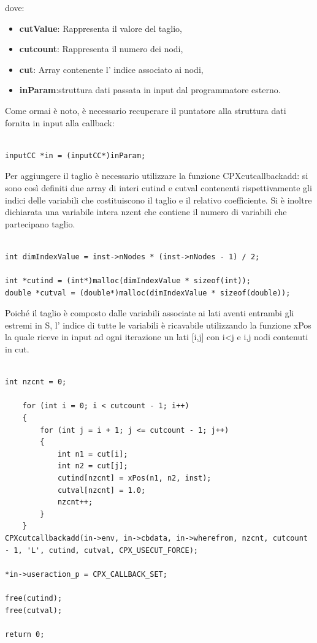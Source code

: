 \documentclass[11pt]{article}
\begin{document}
dove:

\begin{itemize}
	\item \textbf{cutValue}: Rappresenta il valore del taglio,
	\item \textbf{cutcount}: Rappresenta il numero dei nodi,
	\item \textbf{cut}: Array contenente l' indice associato ai nodi,
	\item \textbf{inParam}:struttura dati passata in input dal programmatore esterno.
\end{itemize}

Come ormai è noto, è necessario recuperare il puntatore alla struttura dati fornita in input alla callback:

\begin{lstlisting}

inputCC *in = (inputCC*)inParam;

\end{lstlisting}

Per aggiungere il taglio è necessario utilizzare la funzione CPXcutcallbackadd: si sono così definiti due array di interi cutind e cutval contenenti rispettivamente gli indici delle variabili che costituiscono il taglio e il relativo coefficiente. Si è inoltre dichiarata una variabile intera nzcnt che contiene il numero di variabili che partecipano taglio. 

\begin{lstlisting}

int dimIndexValue = inst->nNodes * (inst->nNodes - 1) / 2; 

int *cutind = (int*)malloc(dimIndexValue * sizeof(int));
double *cutval = (double*)malloc(dimIndexValue * sizeof(double));
\end{lstlisting}


Poiché il taglio è composto dalle variabili associate ai lati aventi entrambi gli estremi in S, l’ indice di tutte le variabili è ricavabile utilizzando la funzione xPos la quale riceve in input ad ogni iterazione un lati [i,j] con i<j e i,j nodi contenuti in cut. 

\begin{lstlisting}

int nzcnt = 0;

	for (int i = 0; i < cutcount - 1; i++)
	{
		for (int j = i + 1; j <= cutcount - 1; j++)
		{
			int n1 = cut[i];
			int n2 = cut[j];
			cutind[nzcnt] = xPos(n1, n2, inst);
			cutval[nzcnt] = 1.0;
			nzcnt++;
		}
	}
CPXcutcallbackadd(in->env, in->cbdata, in->wherefrom, nzcnt, cutcount - 1, 'L', cutind, cutval, CPX_USECUT_FORCE);

*in->useraction_p = CPX_CALLBACK_SET;

free(cutind);
free(cutval);

return 0;

\end{lstlisting}
\end{document}
